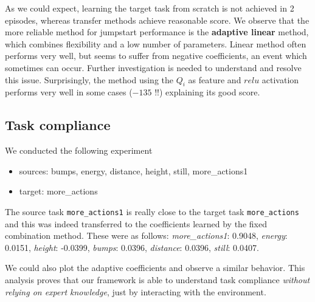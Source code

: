 \documentclass{article}
\begin{document}
\begin{table}[!hbt]
\vskip 0.25cm
\caption{Jump start performance after 2 episodes}
\end{table}

As we could expect, learning the target task from scratch is not achieved in 2 episodes, whereas transfer methods achieve reasonable score. We observe that the more reliable method for jumpstart performance is the \textbf{adaptive linear} method, which combines flexibility and a low number of parameters. Linear method often performs very well, but seems to suffer from negative coefficients, an event which sometimes can occur. Further investigation is needed to understand and resolve this issue. Surprisingly, the method using the $Q_i$ as feature and $relu$ activation performs very well in some cases ($ -135 $ !!) explaining its good score.


\subsection{Task compliance}

We conducted the following experiment
\begin{itemize}
\item sources: bumps, energy, distance, height, still, more\_actions1
\item target: more\_actions
\end{itemize}

The source task \texttt{more\_actions1} is really close to the target task \texttt{more\_actions} and this was indeed transferred to the coefficients learned by the fixed combination method. These were as follows:
\textit{more\_actions1}: 0.9048, \textit{energy}: 0.0151, \textit{height}: -0.0399, \textit{bumps}: 0.0396, \textit{distance}: 0.0396, \textit{still}: 0.0407.

We could also plot the adaptive coefficients and observe a similar behavior. This analysis proves that our framework is able to understand task compliance \textit{without relying on expert knowledge}, just by interacting with the environment.
\end{document}

